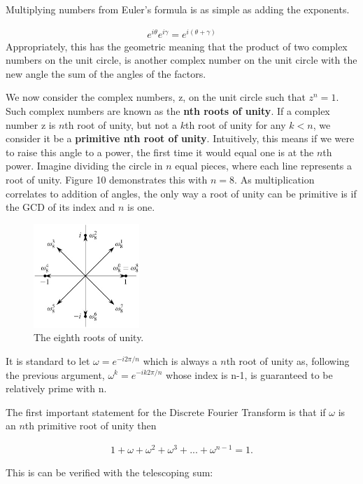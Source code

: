 \documentclass[DIV=calc, paper=a4, fontsize=11pt, twocolumn]{scrartcl}   %
\begin{document}
Multiplying numbers from Euler's formula is as simple as adding the exponents.

\begin{align}
e^{i\theta}e^{i\gamma} = e^{i(\theta+\gamma)}
\end{align}
Appropriately, this has the geometric meaning that the product of two complex numbers on the unit circle, is another complex number on the unit circle with the new angle the sum of the angles of the factors.
\par We now consider the complex numbers, z, on the unit circle such that $z^n = 1 $. Such complex numbers are known as the \textbf{nth roots of unity}. If a complex number z is $n$th root of unity, but not a $k$th root of unity for any $k<n$, we consider it be a \textbf{primitive nth root of unity}. Intuitively, this means if we were to raise this angle to a power, the first time it would equal one is at the $n$th power. Imagine dividing the circle in $n$ equal pieces, where each line represents a root of unity. Figure 10 demonstrates this with $n=8$. As multiplication correlates to addition of angles, the only way a root of unity can be primitive is if the GCD of its index and $n$ is one.

\begin{figure}[h]
\centering
\includegraphics[width=40mm]{figures/eighthroots.jpg}
\caption{The eighth roots of unity. }
\label{overflow}
\end{figure}


 It is standard to let $\omega = e^{-i2\pi/n}$ which is always a $n$th root of unity as, following the previous argument, $\omega^k = e^{-ik2\pi/n}$ whose index is n-1, is guaranteed to be relatively prime with n.


The first important statement for the Discrete Fourier Transform is that if $\omega$ is an $n$th primitive root of unity then

\begin{align}
1 + \omega + \omega^2 + \omega^3 + ... + \omega^{n-1} = 1.
\end{align}

This is can be verified with the telescoping sum:
\end{document}
